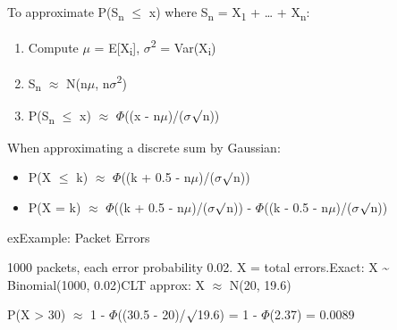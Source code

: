 

To approximate P(S\textsubscript{n} \ensuremath{\le} x) where S\textsubscript{n} = X\textsubscript{1} + … + X\textsubscript{n}:

\begin{enumerate}
\def\labelenumi{\arabic{enumi}.}
\tightlist
\item
  Compute \ensuremath{\mu} = E[X\textsubscript{i}], \ensuremath{\sigma}\textsuperscript{2} = Var(X\textsubscript{i})
\item
  S\textsubscript{n} \ensuremath{\approx} N(n\ensuremath{\mu}, n\ensuremath{\sigma}\textsuperscript{2})
\item
  P(S\textsubscript{n} \ensuremath{\le} x) \ensuremath{\approx} \ensuremath{\Phi}((x - n\ensuremath{\mu})/(\ensuremath{\sigma}\ensuremath{\surd}n))
\end{enumerate}


When approximating a discrete sum by Gaussian:

\begin{itemize}
\tightlist
\item
  P(X \ensuremath{\le} k) \ensuremath{\approx} \ensuremath{\Phi}((k + 0.5 - n\ensuremath{\mu})/(\ensuremath{\sigma}\ensuremath{\surd}n))
\item
  P(X = k) \ensuremath{\approx} \ensuremath{\Phi}((k + 0.5 - n\ensuremath{\mu})/(\ensuremath{\sigma}\ensuremath{\surd}n)) - \ensuremath{\Phi}((k - 0.5 - n\ensuremath{\mu})/(\ensuremath{\sigma}\ensuremath{\surd}n))
\end{itemize}

\begin{PSbox}[unbreakable]{ex}{Example: Packet Errors}

1000 packets, each error probability 0.02. X = total errors.\PSbr{}Exact: X \textasciitilde{} Binomial(1000, 0.02)\PSbr{}CLT approx: X \ensuremath{\approx} N(20, 19.6)

P(X \textgreater{} 30) \ensuremath{\approx} 1 - \ensuremath{\Phi}((30.5 - 20)/\ensuremath{\surd}19.6) = 1 - \ensuremath{\Phi}(2.37) = 0.0089

\end{PSbox}


